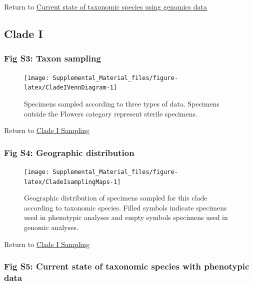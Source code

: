 \documentclass[
  11pt,
]{article}
\begin{document}
Return to \protect\hyperlink{current-state-of-taxonomic-species-using-genomics-data}{Current state of taxonomic species using genomics data}
\pagebreak

\hypertarget{clade-i-2}{%
\subsection{Clade I}\label{clade-i-2}}

\hypertarget{fig-s3-taxon-sampling}{%
\subsubsection{Fig S3: Taxon sampling}\label{fig-s3-taxon-sampling}}

\begin{figure}

{\centering \texttt{[image: Supplemental\_Material\_files/figure-latex/CladeIVennDiagram-1]} 

}

\caption{Specimens sampled according to three types of data. Specimens outside the Flowers category represent sterile specimens.}\label{fig:CladeIVennDiagram}
\end{figure}

Return to \protect\hyperlink{sampling-1}{Clade I Sampling}
\pagebreak

\hypertarget{fig-s4-geographic-distribution}{%
\subsubsection{Fig S4: Geographic distribution}\label{fig-s4-geographic-distribution}}

\begin{figure}

{\centering \texttt{[image: Supplemental\_Material\_files/figure-latex/CladeIsamplingMaps-1]} 

}

\caption{Geographic distribution of specimens sampled for this clade according to taxonomic species. Filled symbols indicate specimens used in phenotypic analyses and empty symbols specimens used in genomic analyses.}\label{fig:CladeIsamplingMaps}
\end{figure}

Return to \protect\hyperlink{sampling-1}{Clade I Sampling}
\pagebreak

\hypertarget{fig-s5-current-state-of-taxonomic-species-with-phenotypic-data}{%
\subsubsection{Fig S5: Current state of taxonomic species with phenotypic data}\label{fig-s5-current-state-of-taxonomic-species-with-phenotypic-data}}
\end{document}

